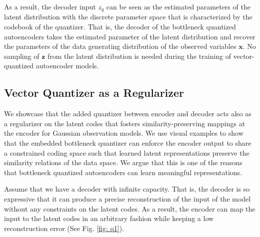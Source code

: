 \documentclass[letterpaper]{article} %
\begin{document}
As a result, the decoder input $z_q$ can be seen as the estimated parameters of the latent distribution with the discrete parameter space that is characterized by the codebook of the quantizer. That is, the decoder of the bottleneck quantized autoencoders takes the estimated parameter of the latent distribution and recover the parameters of the data generating distribution of the observed variables $\mathbf{x}$. No sampling of $\mathbf{z}$ from the latent distribution is needed during the training of vector-quantized autoencoder models.
\subsection{Vector Quantizer as a Regularizer}
We showcase that the added quantizer between encoder and decoder acts also as a regularizer on the latent codes that fosters similarity-preserving mappings at the encoder for Gaussian observation models. We use visual examples to show that the embedded bottleneck quantizer can enforce the encoder output to share a constrained coding space such that learned latent representations preserve the similarity relations of the data space. We argue that this is one of the reasons that bottleneck quantized autoencoders can learn meaningful representations.

Assume that we have a decoder with infinite capacity. That is, the decoder is so expressive that it can produce a precise reconstruction of the input of the model without any constraints on the latent codes. As a result, the encoder can map the input to the latent codes in an arbitrary fashion while keeping a low reconstruction error (See Fig. \ref{fig: q1}).
\end{document}
